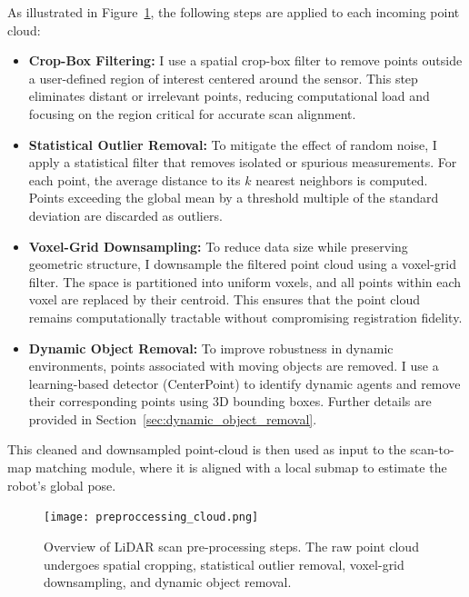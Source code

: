 As illustrated in Figure~\ref{fig:lidar-preprocessing}, the following steps are applied to each incoming point cloud:

\begin{itemize}
	\item \textbf{Crop-Box Filtering:} I use a spatial crop-box filter to remove points outside a user-defined region of interest centered around the sensor. This step eliminates distant or irrelevant points, reducing computational load and focusing on the region critical for accurate scan alignment.
	
	\item \textbf{Statistical Outlier Removal:} To mitigate the effect of random noise, I apply a statistical filter that removes isolated or spurious measurements. For each point, the average distance to its $k$ nearest neighbors is computed. Points exceeding the global mean by a threshold multiple of the standard deviation are discarded as outliers.
	
	\item \textbf{Voxel-Grid Downsampling:} To reduce data size while preserving geometric structure, I downsample the filtered point cloud using a voxel-grid filter. The space is partitioned into uniform voxels, and all points within each voxel are replaced by their centroid. This ensures that the point cloud remains computationally tractable without compromising registration fidelity.
	
 \item \textbf{Dynamic Object Removal:} To improve robustness in dynamic environments, points associated with moving objects are removed. I use a learning-based detector (CenterPoint) to identify dynamic agents and remove their corresponding points using 3D bounding boxes. Further details are provided in Section~\ref{sec:dynamic_object_removal}.
\end{itemize}

This cleaned and downsampled point-cloud is then used as input to the scan-to-map matching module, where it is aligned with a local submap to estimate the robot's global pose.


\begin{figure}[ht]
	\centering
	\texttt{[image: preproccessing\_cloud.png]}
\caption{Overview of LiDAR scan pre-processing steps. The raw point cloud undergoes spatial cropping, statistical outlier removal, voxel-grid downsampling, and dynamic object removal.}
\label{fig:lidar-preprocessing}

\end{figure}


